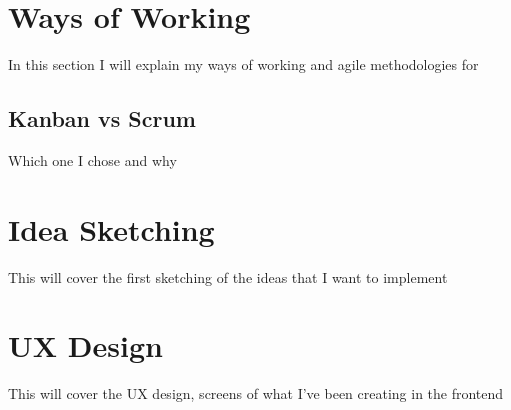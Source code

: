 \section{Ways of Working}
\label{s:Ways-of-Working}
In this section I will explain my ways of working and agile methodologies for

\subsection{Kanban vs Scrum}
\label{s:Kanban-vs-Scrum}
Which one I chose and why

\section{Idea Sketching}
\label{s:Idea-Sketching}
This will cover the first sketching of the ideas that I want to implement

\section{UX Design}
\label{s:UX-Design}
This will cover the UX design, screens of what I've been creating in the frontend
